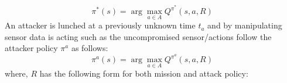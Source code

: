 \documentclass[letterpaper, 10 pt, conference]{ieeeconf}  %
\newtheorem{problem}{Problem}
\newcommand\NB[1]{$\spadesuit$\footnote{NB: #1}}
\begin{document}
\begin{equation}
\pi^*(s) = \arg\!\max_{a\in A} Q^{\pi^*}(s,a,R)
\end{equation}
An attacker is lunched at a previously unknown time $t_a$ and by manipulating sensor data is acting such as the uncompromised sensor/actions follow the attacker policy $\pi^a$ as follows:
\begin{equation}
\pi^a(s) = \arg\!\max_{a\in A} Q^{\pi^a}(s,a,R)
\end{equation}
where, $R$ has the following form for both mission and attack policy:
%
\end{document}
